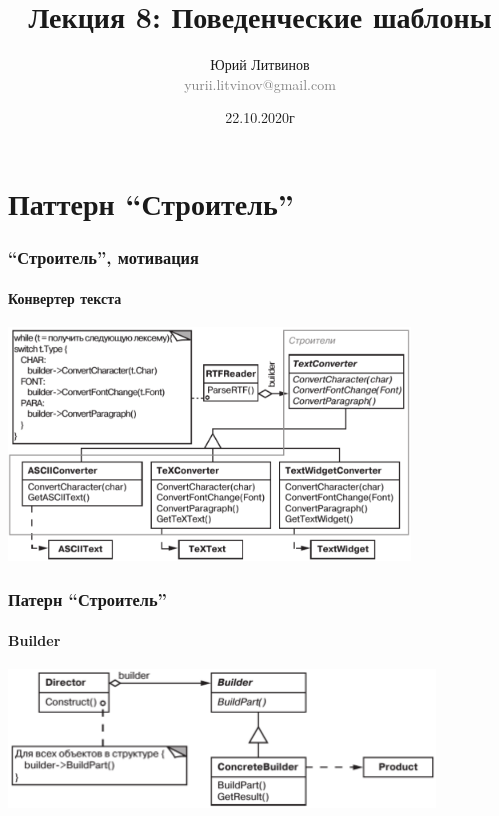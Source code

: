 \documentclass[xetex,mathserif,serif]{beamer}
\title[Шаблоны]{Лекция 8: Поведенческие шаблоны}
\author[Юрий Литвинов]{Юрий Литвинов\\\small{\textcolor{gray}{yurii.litvinov@gmail.com}}}
\date{22.10.2020г}
\begin{document}
	\frame{\titlepage}

	\section{Паттерн ``Строитель''}

	\begin{frame}
		\frametitle{``Строитель'', мотивация}
		\framesubtitle{Конвертер текста}
		\begin{center}
			\includegraphics[width=0.8\textwidth]{textConverter.png}
		\end{center}
	\end{frame}

	\begin{frame}
		\frametitle{Патерн ``Строитель''}
		\framesubtitle{Builder}
		\begin{center}
			\includegraphics[width=0.85\textwidth]{builder.png}
		\end{center}
	\end{frame}
	
\end{document}
